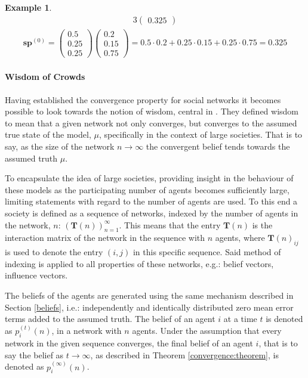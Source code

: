 \documentclass[a4paper, 12pt]{report}
\newtheorem{example}{Example}
\newcommand{\T}{\bm{T}}
\newcommand{\Soc}{(\T(n))^{\infty}_{n=1}}
\newcommand{\beli}[3][2]{p_{#2}^{(#3)}}
\begin{document}
\begin{example}
\begin{alignat*}{3}
\begin{pmatrix}
            0.325
        \end{pmatrix}
    \end{alignat*}
    \begin{align*}
        \bm{sp}^{(0)} = 
        \begin{pmatrix}
            0.5 \\
            0.25 \\
            0.25
        \end{pmatrix}
        \begin{pmatrix}
            0.2 \\
            0.15 \\
            0.75
        \end{pmatrix}= 0.5 \cdot 0.2 + 0.25 \cdot 0.15 + 0.25 \cdot 0.75 = 0.325
    \end{align*}
\end{example}

\newpage

\paragraph{Wisdom of Crowds}
\label{wisdom}
Having established the convergence property for social networks it becomes possible to look towards the notion of wisdom, central in \cite{golub2010naive}. They defined wisdom to mean that a given network not only converges, but converges to the assumed true state of the model, $\mu$, specifically in the context of large societies. That is to say, as the size of the network $n\to\infty$ the convergent belief tends towards the assumed truth $\mu$.

To encapsulate the idea of large societies, providing insight in the behaviour of these models as the participating number of agents becomes sufficiently large, limiting statements with regard to the number of agents are used. To this end a society is defined as a sequence of networks, indexed by the number of agents in the network, $n$: $\Soc$. This means that the entry $\textbf{T}(n)$ is the interaction matrix of the network in the sequence with $n$ agents, where $\textbf{T}(n)_{ij}$ is used to denote the entry $(i,j)$ in this specific sequence. Said method of indexing is applied to all properties of these networks, e.g.: belief vectors, influence vectors.

The beliefs of the agents are generated using the same mechanism described in Section \ref{beliefs}, i.e.: independently and identically distributed zero mean error terms added to the assumed truth. The belief of an agent $i$ at a time $t$ is denoted as $\beli{i}{t}(n)$, in a network with $n$ agents. Under the assumption that every network in the given sequence converges, the final belief of an agent $i$, that is to say the belief as $t \to\infty$, as described in Theorem \ref{convergence:theorem}, is denoted as $\beli{i}{\infty}(n)$.
\end{document}
